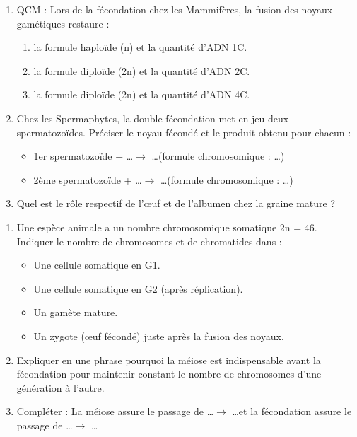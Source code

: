 \documentclass[11pt]{article}
\begin{document}
\begin{exercice}
\begin{enumerate}
    \item QCM : Lors de la fécondation chez les Mammifères, la fusion des noyaux gamétiques restaure :
    \begin{enumerate}
        \item la formule haploïde (n) et la quantité d'ADN 1C.
        \item la formule diploïde (2n) et la quantité d'ADN 2C.
        \item la formule diploïde (2n) et la quantité d'ADN 4C.
    \end{enumerate}
    \item Chez les Spermaphytes, la double fécondation met en jeu deux spermatozoïdes. Préciser le noyau fécondé et le produit obtenu pour chacun :
    \begin{itemize}
        \item 1er spermatozoïde + \dots $\rightarrow$ \dots (formule chromosomique : \dots)
        \item 2ème spermatozoïde + \dots $\rightarrow$ \dots (formule chromosomique : \dots)
    \end{itemize}
    \item Quel est le rôle respectif de l'œuf et de l'albumen chez la graine mature ?
\end{enumerate}
\end{exercice}

\begin{exercice}
\begin{enumerate}
    \item Une espèce animale a un nombre chromosomique somatique 2n = 46. Indiquer le nombre de chromosomes et de chromatides dans :
    \begin{itemize}
        \item Une cellule somatique en G1.
        \item Une cellule somatique en G2 (après réplication).
        \item Un gamète mature.
        \item Un zygote (œuf fécondé) juste après la fusion des noyaux.
    \end{itemize}
    \item Expliquer en une phrase pourquoi la méiose est indispensable avant la fécondation pour maintenir constant le nombre de chromosomes d'une génération à l'autre.
    \item Compléter : La méiose assure le passage de \dots $\rightarrow$ \dots et la fécondation assure le passage de \dots $\rightarrow$ \dots
\end{enumerate}
\end{exercice}
\end{document}
